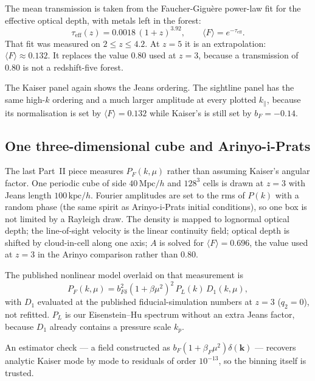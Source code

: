 \documentclass[11pt]{article}
\begin{document}
The mean transmission is taken from the Faucher-Gigu\`ere power-law fit for the effective optical depth, with metals left in the forest:
\begin{equation*}
\tau_\mathrm{eff}(z)=0.0018\,(1+z)^{3.92},\qquad
\langle F\rangle=e^{-\tau_\mathrm{eff}}.
\end{equation*}
That fit was measured on $2\le z\le 4.2$.
At $z=5$ it is an extrapolation: $\langle F\rangle\approx 0.132$.
It replaces the value $0.80$ used at $z=3$, because a transmission of $0.80$ is not a redshift-five forest.

The Kaiser panel again shows the Jeans ordering.
The sightline panel has the same high-$k$ ordering and a much larger amplitude at every plotted $k_\parallel$, because its normalisation is set by $\langle F\rangle=0.132$ while Kaiser's is still set by $b_F=-0.14$.

\subsection{One three-dimensional cube and Arinyo-i-Prats}

The last Part~II piece measures $P_F(k,\mu)$ rather than assuming Kaiser's angular factor.
One periodic cube of side $40\,\mathrm{Mpc}/h$ and $128^{3}$ cells is drawn at $z=3$ with Jeans length $100\,\mathrm{kpc}/h$.
Fourier amplitudes are set to the rms of $P(k)$ with a random phase (the same spirit as Arinyo-i-Prats initial conditions), so one box is not limited by a Rayleigh draw.
The density is mapped to lognormal optical depth; the line-of-sight velocity is the linear continuity field; optical depth is shifted by cloud-in-cell along one axis; $A$ is solved for $\langle F\rangle=0.696$, the value used at $z=3$ in the Arinyo comparison rather than $0.80$.

The published nonlinear model overlaid on that measurement is
\begin{equation*}
P_F(k,\mu)=b_{F\delta}^{2}(1+\beta\mu^{2})^{2}\,P_L(k)\,D_1(k,\mu),
\end{equation*}
with $D_1$ evaluated at the published fiducial-simulation numbers at $z=3$ ($q_2=0$), not refitted.
$P_L$ is our Eisenstein--Hu spectrum without an extra Jeans factor, because $D_1$ already contains a pressure scale $k_p$.

An estimator check --- a field constructed as $b_F(1+\beta_F\mu^{2})\delta(\mathbf{k})$ --- recovers analytic Kaiser mode by mode to residuals of order $10^{-13}$, so the binning itself is trusted.
\end{document}
